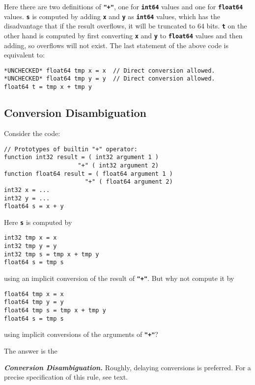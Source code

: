 \documentclass[12pt]{article}
\newcommand{\TT}[1]{{\tt \bfseries #1}}
\newcommand{\ikey}[2]{{\bf \em #1}\index{#2}}
\newenvironment{indpar}[1][0.3in]%
	{\begin{list}{}%
		     {\setlength{\itemsep}{0in}%
		      \setlength{\topsep}{0in}%
		      \setlength{\parsep}{1ex}%
		      \setlength{\labelwidth}{#1}%
		      \setlength{\leftmargin}{#1}%
		      \addtolength{\leftmargin}{\labelsep}}%
	 \item}%
	{\end{list}}
\begin{document}
Here there are two definitions of \TT{"+"}, one for \TT{int64}
values and one for \TT{float64} values.
\TT{s} is computed by adding \TT{x} and \TT{y} as \TT{int64}
values, which has the disadvantage that if the result overflows,
it will be truncated to 64 bits.  \TT{t} on the other hand is
computed by first converting \TT{x} and \TT{y} to \TT{float64}
values and then adding, so overflows will not exist.  The last
statement of the above code is equivalent to:
\begin{indpar}\begin{verbatim}
*UNCHECKED* float64 tmp x = x  // Direct conversion allowed.
*UNCHECKED* float64 tmp y = y  // Direct conversion allowed.
float64 t = tmp x + tmp y
\end{verbatim}\end{indpar}


\subsection{Conversion Disambiguation}
\label{CONVERSION-DISAMBIGUATION}

Consider the code:
\begin{indpar}\begin{verbatim}
// Prototypes of builtin "+" operator:
function int32 result = ( int32 argument 1 )
                     "+" ( int32 argument 2)
function float64 result = ( float64 argument 1 )
                       "+" ( float64 argument 2)
int32 x = ...
int32 y = ...
float64 s = x + y
\end{verbatim}\end{indpar}

Here \TT{s} is computed by
\begin{indpar}\begin{verbatim}
int32 tmp x = x
int32 tmp y = y
int32 tmp s = tmp x + tmp y
float64 s = tmp s
\end{verbatim}\end{indpar}
using an implicit conversion of the result of \TT{"+"}.
But why not compute it by
\begin{indpar}\begin{verbatim}
float64 tmp x = x
float64 tmp y = y
float64 tmp s = tmp x + tmp y
float64 s = tmp s
\end{verbatim}\end{indpar}
using implicit conversions of the arguments of \TT{"+"}?

The answer is the
\begin{indpar}
\ikey{Conversion Disambiguation.}{conversion disambiguation}%
 Roughly, delaying conversions is
preferred.  For a precise specification of this rule, see text.
\end{indpar}
\end{document}
